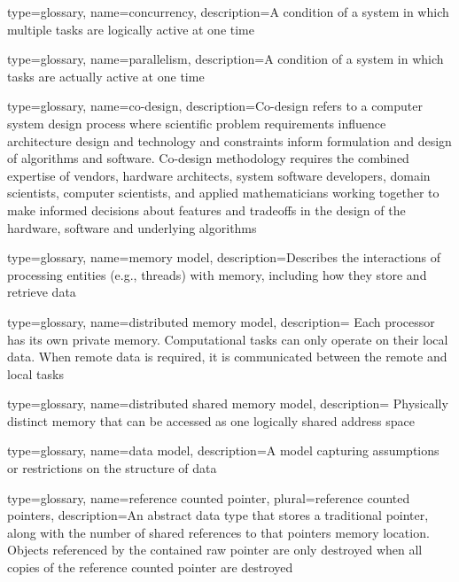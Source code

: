 {
  type=glossary,
  name={concurrency},
  description={A condition of a system in which multiple tasks are logically
    active at one time}
}

{
  type=glossary,
  name={parallelism},
  description={A condition of a system in which tasks are actually active at
    one time}
}

{
  type=glossary,
  name=co-design,
  description={Co-design refers to a computer system design process where
    scientific problem requirements influence architecture design and
      technology and constraints inform formulation and design of algorithms
      and software.  Co-design methodology requires the combined expertise of
      vendors, hardware architects, system software developers, domain
      scientists, computer scientists, and applied mathematicians working
      together to make informed decisions about features and tradeoffs in the
      design of the hardware, software and underlying
      algorithms~\cite{co-design}}
}

{
  type=glossary,
  name={memory model},
  description={Describes the interactions of processing entities (e.g.,
      threads) with memory, including how they store and retrieve data}
}

{
  type=glossary,
  name={distributed memory model},
  description={ Each processor has its own private memory. 
     Computational tasks can only operate on their local data. When remote data
     is required, it is communicated between the remote and local tasks}
}

{
  type=glossary,
  name={distributed shared memory model},
  description={ Physically distinct memory that can be accessed as one
    logically shared address space}
}

{
  type=glossary,
  name={data model},
  description={A model capturing assumptions or restrictions on the structure of data}
}


{
  type=glossary,
  name={reference counted pointer},
  plural={reference counted pointers},
  description={An abstract data type that stores a traditional pointer, along
    with the number of shared references to that pointers
    memory location.  Objects referenced by the contained raw pointer are only
     destroyed when all copies of the reference counted pointer are destroyed} 
}

